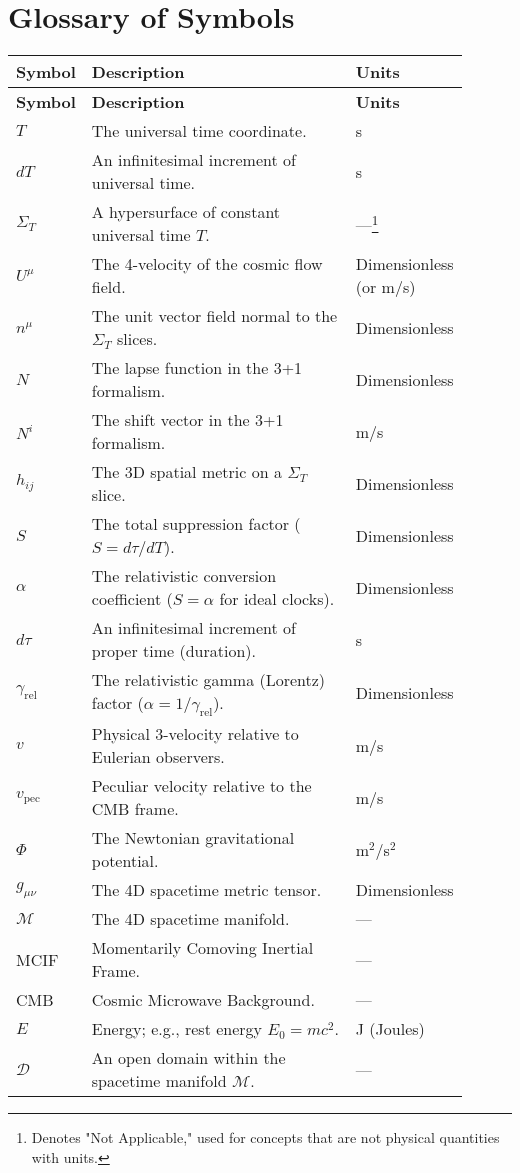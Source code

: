 \documentclass[12pt]{article}
\theoremstyle{plain}
\newcommand{\gammarel}{\gamma_{\!\mathrm{rel}}}
\begin{document}
\section{Glossary of Symbols}
\vspace{-1.0em}
\begin{longtable}{p{0.15\linewidth} p{0.6\linewidth} p{0.15\linewidth}}
    \toprule
    \textbf{Symbol} & \textbf{Description} & \textbf{Units} \\
    \midrule
    \endfirsthead
    \toprule
    \textbf{Symbol} & \textbf{Description} & \textbf{Units} \\
    \midrule
    $T$ & The universal time coordinate. & s \\
    $dT$ & An infinitesimal increment of universal time. & s \\
    $\Sigma_T$ & A hypersurface of constant universal time $T$. & ---\footnote{Denotes "Not Applicable," used for concepts that are not physical quantities with units.} \\
    $U^\mu$ & The 4-velocity of the cosmic flow field. & Dimensionless (or m/s) \\
    $n^\mu$ & The unit vector field normal to the $\Sigma_T$ slices. & Dimensionless \\
    $N$ & The lapse function in the 3+1 formalism. & Dimensionless \\
    $N^i$ & The shift vector in the 3+1 formalism. & m/s \\
    $h_{ij}$ & The 3D spatial metric on a $\Sigma_T$ slice. & Dimensionless \\
    $S$ & The total suppression factor ($S = d\tau/dT$). & Dimensionless \\
    $\alpha$ & The relativistic conversion coefficient ($S=\alpha$ for ideal clocks). & Dimensionless \\
    $d\tau$ & An infinitesimal increment of proper time (duration). & s \\
    $\gammarel$ & The relativistic gamma (Lorentz) factor ($\alpha = 1/\gammarel$). & Dimensionless \\
    $v$ & Physical 3-velocity relative to Eulerian observers. & m/s \\
    $v_{\mathrm{pec}}$ & Peculiar velocity relative to the CMB frame. & m/s \\
    $\Phi$ & The Newtonian gravitational potential. & m$^2$/s$^2$ \\
    $g_{\mu\nu}$ & The 4D spacetime metric tensor. & Dimensionless \\
    $\mathcal{M}$ & The 4D spacetime manifold. & --- \\
    MCIF & Momentarily Comoving Inertial Frame. & --- \\
    CMB & Cosmic Microwave Background. & --- \\
    $E$ & Energy; e.g., rest energy $E_0=mc^2$. & J (Joules) \\
    $\mathcal{D}$ & An open domain within the spacetime manifold $\mathcal{M}$. & --- \\
    \bottomrule
\end{longtable}
\end{document}
